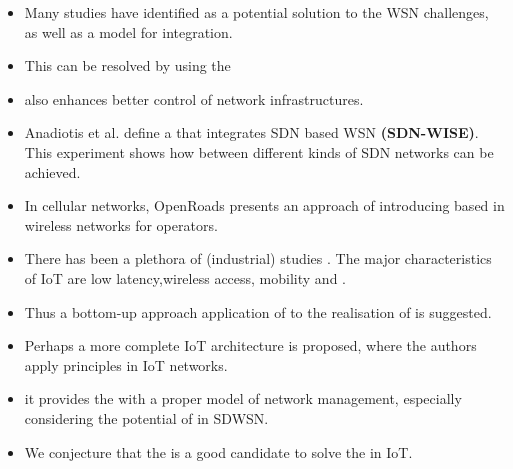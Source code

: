 \begin{itemize}
	\item[\cite{qin_software_2014}] Many studies have identified  as a potential solution to the WSN challenges,
	as well as a model for  integration.
	\item[\cite{qin_software_2014}] This  can be resolved by using the 
	\item[\cite{kobo_survey_2017}]  also enhances better control of  network infrastructures.
	\item[\cite{kobo_survey_2017}] Anadiotis et al. define a  that integrates SDN based WSN \textbf{(SDN-WISE)}.
		This experiment shows how  between different kinds of SDN networks can be achieved.
	\item[\cite{kobo_survey_2017}] In cellular networks,
		OpenRoads presents an approach of introducing  based  in wireless networks for operators.
	\item[\cite{ndiaye_software_2017}] There has been a plethora of (industrial) studies .
			The major characteristics of IoT are low latency,wireless access, mobility and .
	\item[\cite{ndiaye_software_2017}] Thus a bottom-up approach application of  to the realisation of  is suggested.
	\item[\cite{ndiaye_software_2017}] Perhaps a more complete IoT architecture is proposed,
			where the authors apply  principles in IoT  networks.
	\item[\cite{bera_softwaredefined_2017}] it provides the  with a proper model of network management,
			especially considering the potential of  in SDWSN.
	\item[\cite{bera_softwaredefined_2017}] We conjecture that the  is a good candidate to solve the  in IoT.

\end{itemize}


